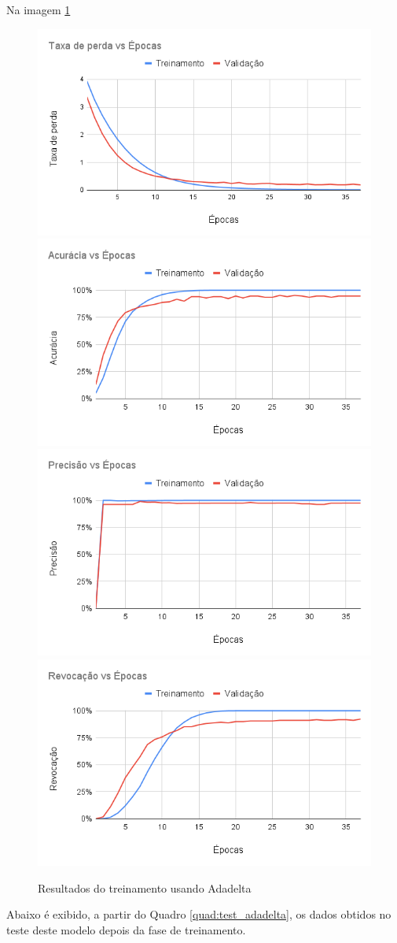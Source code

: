 \documentclass[
	12pt,				%
	oneside,			%
	a4paper,			%
	english,			%
	brazil				%
	]{abntex2ppgsi}
\begin{document}
Na imagem \ref{fig:adadelta_training} 
\begin{figure}[H]
    \centering
    \caption{Resultados do treinamento usando Adadelta}
    \includegraphics[width=.50\textwidth]{imagens/resultados_discussao/optimizer/adadelta/perda.png}\hfill
    \includegraphics[width=.50\textwidth]{imagens/resultados_discussao/optimizer/adadelta/acuracia.png}\bigbreak    \includegraphics[width=.50\textwidth]{imagens/resultados_discussao/optimizer/adadelta/precisao.png}\hfill
    \includegraphics[width=.50\textwidth]{imagens/resultados_discussao/optimizer/adadelta/revocacao.png}
    \label{fig:adadelta_training}
\end{figure}

Abaixo é exibido, a partir do Quadro \ref{quad:test_adadelta}, os dados obtidos no teste deste modelo depois da fase de treinamento.
\end{document}
